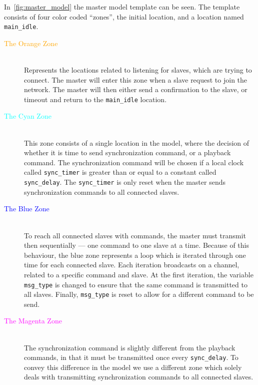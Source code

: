 In~\cref{fig:master_model} the master model template can be seen.
The template consists of four color coded \enquote{zones}, the initial location, and a location named \texttt{main\_idle}.

\begin{description}
    \item[\textcolor{orange}{The Orange Zone}] \hfill\\
        Represents the locations related to listening for slaves, which are trying to connect.
        The master will enter this zone when a slave request to join the network.
        The master will then either send a confirmation to the slave, or timeout and return to the \texttt{main\_idle} location.
    \item[\textcolor{cyan}{The Cyan Zone}] \hfill\\
        This zone consists of a single location in the model, where the decision of whether it is time to send synchronization command, or a playback command.
        The synchronization command will be chosen if a local clock called \texttt{sync\_timer} is greater than or equal to a constant called \texttt{sync\_delay}.
        The \texttt{sync\_timer} is only reset when the master sends synchronization commands to all connected slaves.
    \item[\textcolor{blue}{The Blue Zone}] \hfill\\
        To reach all connected slaves with commands, the master must transmit then sequentially --- one command to one slave at a time.
        Because of this behaviour, the blue zone represents a loop which is iterated through one time for each connected slave.
        Each iteration broadcasts on a channel, related to a specific command and slave.
        At the first iteration, the variable \texttt{msg\_type} is changed to ensure that the same command is transmitted to all slaves.
        Finally, \texttt{msg\_type} is reset to allow for a different command to be send.
    \item[\textcolor{magenta}{The Magenta Zone}] \hfill\\
        The synchronization command is slightly different from the playback commands, in that it must be transmitted once every \texttt{sync\_delay}.
        To convey this difference in the model we use a different zone which solely deals with transmitting synchronization commands to all connected slaves.
\end{description}

